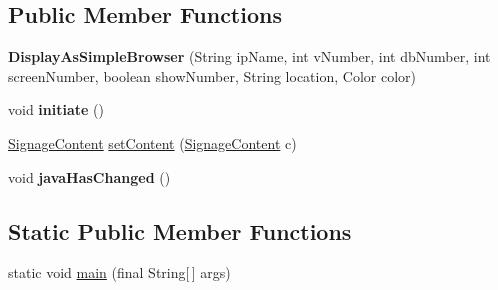 \subsection*{Public Member Functions}
\begin{DoxyCompactItemize}
\item 
\hypertarget{classgov_1_1fnal_1_1ppd_1_1dd_1_1display_1_1client_1_1simplified_1_1DisplayAsSimpleBrowser_a5eebea04df2b0fa101ccbecea55c3ae9}{{\bfseries Display\-As\-Simple\-Browser} (String ip\-Name, int v\-Number, int db\-Number, int screen\-Number, boolean show\-Number, String location, Color color)}\label{classgov_1_1fnal_1_1ppd_1_1dd_1_1display_1_1client_1_1simplified_1_1DisplayAsSimpleBrowser_a5eebea04df2b0fa101ccbecea55c3ae9}

\item 
\hypertarget{classgov_1_1fnal_1_1ppd_1_1dd_1_1display_1_1client_1_1simplified_1_1DisplayAsSimpleBrowser_a9454e792d76150a173105c3d38d6608f}{void {\bfseries initiate} ()}\label{classgov_1_1fnal_1_1ppd_1_1dd_1_1display_1_1client_1_1simplified_1_1DisplayAsSimpleBrowser_a9454e792d76150a173105c3d38d6608f}

\item 
\hyperlink{interfacegov_1_1fnal_1_1ppd_1_1dd_1_1signage_1_1SignageContent}{Signage\-Content} \hyperlink{classgov_1_1fnal_1_1ppd_1_1dd_1_1display_1_1client_1_1simplified_1_1DisplayAsSimpleBrowser_a7b69290947e6bf32aeb5a78a63b5706f}{set\-Content} (\hyperlink{interfacegov_1_1fnal_1_1ppd_1_1dd_1_1signage_1_1SignageContent}{Signage\-Content} c)
\item 
\hypertarget{classgov_1_1fnal_1_1ppd_1_1dd_1_1display_1_1client_1_1simplified_1_1DisplayAsSimpleBrowser_a6661ef807b923f39560f4887d82a7dfd}{void {\bfseries java\-Has\-Changed} ()}\label{classgov_1_1fnal_1_1ppd_1_1dd_1_1display_1_1client_1_1simplified_1_1DisplayAsSimpleBrowser_a6661ef807b923f39560f4887d82a7dfd}

\end{DoxyCompactItemize}
\subsection*{Static Public Member Functions}
\begin{DoxyCompactItemize}
\item 
static void \hyperlink{classgov_1_1fnal_1_1ppd_1_1dd_1_1display_1_1client_1_1simplified_1_1DisplayAsSimpleBrowser_a71434d316d8fcd8eaffa449a0e6fede4}{main} (final String\mbox{[}$\,$\mbox{]} args)
\end{DoxyCompactItemize}
